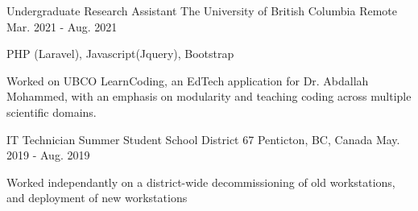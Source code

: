 

\begin{cventries}

  \cventry
    {Undergraduate Research Assistant} %
    {The University of British Columbia} %
    {Remote} %
    {Mar. 2021 - Aug. 2021} %
    {
      \begin{cvitems} %
        \item {PHP (Laravel), Javascript(Jquery), Bootstrap}
        \item {Worked on UBCO LearnCoding, an EdTech application for Dr. Abdallah Mohammed, with an emphasis on modularity and teaching coding across multiple scientific domains.}
      \end{cvitems}
    }

  \cventry
    {IT Technician Summer Student} %
    {School District 67} %
    {Penticton, BC, Canada} %
    {May. 2019 - Aug. 2019} %
    {
      \begin{cvitems} %
        \item {Worked independantly on a district-wide decommissioning of old workstations, and deployment of new workstations}
      \end{cvitems}
    }

\end{cventries}
